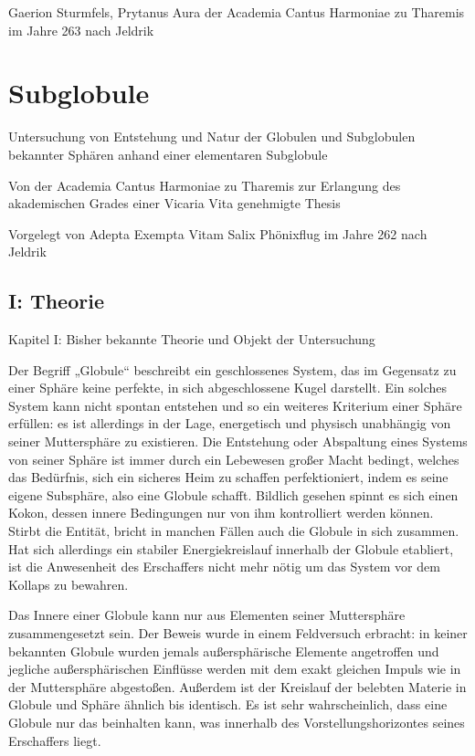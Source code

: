 \documentclass[a5paper,8pt]{book}
\begin{document}
Gaerion Sturmfels,
Prytanus Aura der
Academia Cantus Harmoniae zu Tharemis im Jahre 263 nach Jeldrik

\newpage

\section{Subglobule}


Untersuchung von Entstehung und Natur der Globulen und Subglobulen bekannter Sphären anhand einer elementaren Subglobule

Von der Academia Cantus Harmoniae zu Tharemis zur Erlangung des akademischen Grades einer Vicaria Vita genehmigte Thesis


Vorgelegt von Adepta Exempta Vitam Salix Phönixflug im Jahre 262 nach Jeldrik

\subsection{I: Theorie}

Kapitel I: Bisher bekannte Theorie und Objekt der Untersuchung

Der Begriff „Globule“ beschreibt ein geschlossenes System, das im Gegensatz zu einer Sphäre keine perfekte, in sich 
abgeschlossene Kugel darstellt. Ein solches System kann nicht spontan entstehen und so ein weiteres Kriterium einer 
Sphäre erfüllen: es ist allerdings in der Lage, energetisch und physisch unabhängig von seiner Muttersphäre zu existieren. 
Die Entstehung oder Abspaltung eines Systems von seiner Sphäre ist immer durch ein Lebewesen großer Macht bedingt, welches 
das Bedürfnis, sich ein sicheres Heim zu schaffen perfektioniert, indem es seine eigene Subsphäre, also eine Globule 
schafft. Bildlich gesehen spinnt es sich einen Kokon, dessen innere Bedingungen nur von ihm kontrolliert werden können. 
Stirbt die Entität, bricht in manchen Fällen auch die Globule in sich zusammen. Hat sich allerdings ein stabiler 
Energiekreislauf innerhalb der Globule etabliert, ist die Anwesenheit des Erschaffers nicht mehr nötig um das System vor 
dem Kollaps zu bewahren. 

Das Innere einer Globule kann nur aus Elementen seiner Muttersphäre zusammengesetzt sein. Der Beweis wurde in einem 
Feldversuch erbracht: in keiner bekannten Globule wurden jemals außersphärische Elemente angetroffen und jegliche 
außersphärischen Einflüsse werden mit dem exakt gleichen Impuls wie in der Muttersphäre abgestoßen. Außerdem ist der 
Kreislauf der belebten Materie in Globule und Sphäre ähnlich bis identisch. Es ist sehr wahrscheinlich, dass eine Globule 
nur das beinhalten kann, was innerhalb des Vorstellungshorizontes seines Erschaffers liegt.
\end{document}
